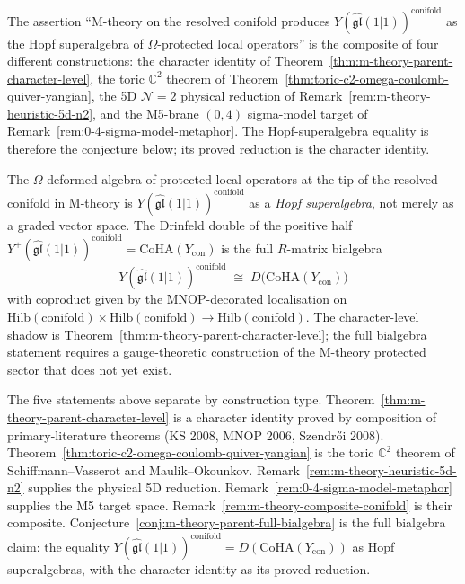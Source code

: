 \begin{remark}
\label{rem:m-theory-composite-conifold}
The assertion ``M-theory on the resolved conifold produces $Y(\widehat{\mathfrak{gl}}(1|1))^{\mathrm{conifold}}$ as the Hopf superalgebra of $\Omega$-protected local operators'' is the composite of four different constructions: the character identity of Theorem~\ref{thm:m-theory-parent-character-level}, the toric $\mathbb{C}^2$ theorem of Theorem~\ref{thm:toric-c2-omega-coulomb-quiver-yangian}, the 5D $\mathcal{N} = 2$ physical reduction of Remark~\ref{rem:m-theory-heuristic-5d-n2}, and the M5-brane $(0,4)$ sigma-model target of Remark~\ref{rem:0-4-sigma-model-metaphor}. The Hopf-superalgebra equality is therefore the conjecture below; its proved reduction is the character identity.
\end{remark}

\begin{conjecture}
\label{conj:m-theory-parent-full-bialgebra}
\ClaimStatusConjectured
The $\Omega$-deformed algebra of protected local operators at the tip of the resolved conifold in M-theory is $Y(\widehat{\mathfrak{gl}}(1|1))^{\mathrm{conifold}}$ as a \emph{Hopf superalgebra}, not merely as a graded vector space. The Drinfeld double of the positive half $Y^+(\widehat{\mathfrak{gl}}(1|1))^{\mathrm{conifold}} = \mathrm{CoHA}(Y_{\mathrm{con}})$ is the full $R$-matrix bialgebra
\[
 Y(\widehat{\mathfrak{gl}}(1|1))^{\mathrm{conifold}} \;\cong\; D\bigl(\mathrm{CoHA}(Y_{\mathrm{con}})\bigr)
\]
with coproduct given by the MNOP-decorated localisation on $\mathrm{Hilb}(\mathrm{conifold}) \times \mathrm{Hilb}(\mathrm{conifold}) \to \mathrm{Hilb}(\mathrm{conifold})$. The character-level shadow is Theorem~\ref{thm:m-theory-parent-character-level}; the full bialgebra statement requires a gauge-theoretic construction of the M-theory protected sector that does not yet exist.
\end{conjecture}

\begin{remark}
\label{rem:m-theory-parent-construction-types}
The five statements above separate by construction type. Theorem~\ref{thm:m-theory-parent-character-level} is a character identity proved by composition of primary-literature theorems (KS 2008, MNOP 2006, Szendr\H{o}i 2008). Theorem~\ref{thm:toric-c2-omega-coulomb-quiver-yangian} is the toric $\mathbb{C}^2$ theorem of Schiffmann--Vasserot and Maulik--Okounkov. Remark~\ref{rem:m-theory-heuristic-5d-n2} supplies the physical 5D reduction. Remark~\ref{rem:0-4-sigma-model-metaphor} supplies the M5 target space. Remark~\ref{rem:m-theory-composite-conifold} is their composite. Conjecture~\ref{conj:m-theory-parent-full-bialgebra} is the full bialgebra claim: the equality $Y(\widehat{\mathfrak{gl}}(1|1))^{\mathrm{conifold}} = D(\mathrm{CoHA}(Y_{\mathrm{con}}))$ as Hopf superalgebras, with the character identity as its proved reduction.
\end{remark}

